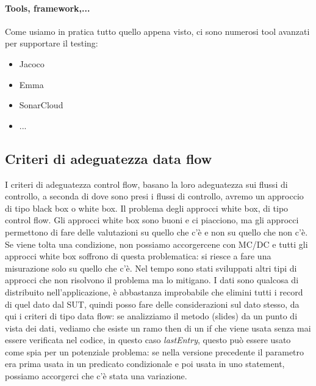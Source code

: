 \documentclass{article}
\begin{document}
\paragraph{Tools, framework,...}
Come usiamo in pratica tutto quello appena visto, ci sono numerosi tool avanzati per supportare il testing:
\begin{itemize}
\item Jacoco
\item Emma
\item SonarCloud
\item ...
\end{itemize}
\subsection{Criteri di adeguatezza data flow}
I criteri di adeguatezza control flow, basano la loro adeguatezza sui flussi di controllo, a seconda di dove sono presi i flussi di controllo, avremo un approccio di tipo black box o white box. Il problema degli approcci white box, di tipo control flow. Gli approcci white box sono buoni e ci piacciono, ma gli approcci permettono di fare delle valutazioni su quello che c'è e non su quello che non c'è. Se viene tolta una condizione, non possiamo accorgercene con MC/DC e tutti gli approcci white box soffrono di questa problematica: si riesce a fare una misurazione solo su quello che c'è. Nel tempo sono stati sviluppati altri tipi di approcci che non risolvono il problema ma lo mitigano. I dati sono qualcosa di distribuito nell'applicazione, è abbastanza improbabile che elimini tutti i record di quel dato dal SUT, quindi posso fare delle considerazioni sul dato stesso, da qui i criteri di tipo data flow: se analizziamo il metodo (slides) da un punto di vista dei dati, vediamo che esiste un ramo then di un if che viene usata senza mai essere verificata nel codice, in questo caso \textit{lastEntry}, questo può essere usato come spia per un potenziale problema: se nella versione precedente il parametro era prima usata in un predicato condizionale e poi usata in uno statement, possiamo accorgerci che c'è stata una variazione.
\end{document}

